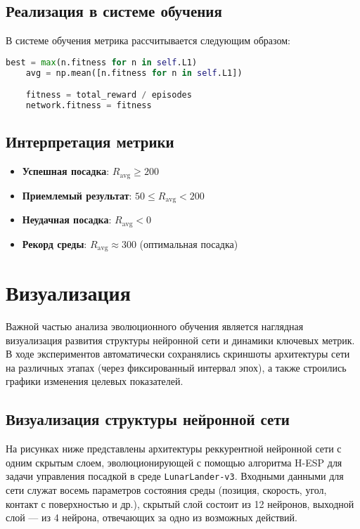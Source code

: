 \documentclass[a4paper,12pt]{article}
\begin{document}
\subsection{Реализация в системе обучения}
В системе обучения метрика рассчитывается следующим образом:

\begin{lstlisting}[language=Python]
    best = max(n.fitness for n in self.L1)
    avg = np.mean([n.fitness for n in self.L1])

    fitness = total_reward / episodes
    network.fitness = fitness
\end{lstlisting}

\subsection{Интерпретация метрики}
\begin{itemize}
	\item \textbf{Успешная посадка}: $R_{\text{avg}} \geq 200$ 
	\item \textbf{Приемлемый результат}: $50 \leq R_{\text{avg}} < 200$
	\item \textbf{Неудачная посадка}: $R_{\text{avg}} < 0$
	\item \textbf{Рекорд среды}: $R_{\text{avg}} \approx 300$ (оптимальная посадка)
\end{itemize}


\newpage
\section{Визуализация}

Важной частью анализа эволюционного обучения является наглядная визуализация развития структуры нейронной сети и динамики ключевых метрик. В ходе экспериментов автоматически сохранялись скриншоты архитектуры сети на различных этапах (через фиксированный интервал эпох), а также строились графики изменения целевых показателей.

\subsection{Визуализация структуры нейронной сети}

На рисунках ниже представлены архитектуры реккурентной нейронной сети с одним скрытым слоем, эволюционирующей с помощью алгоритма H-ESP для задачи управления посадкой в среде \texttt{LunarLander-v3}. Входными данными для сети служат восемь параметров состояния среды (позиция, скорость, угол, контакт с поверхностью и др.), скрытый слой состоит из 12 нейронов, выходной слой --- из 4 нейрона, отвечающих за одно из возможных действий.
\end{document}
